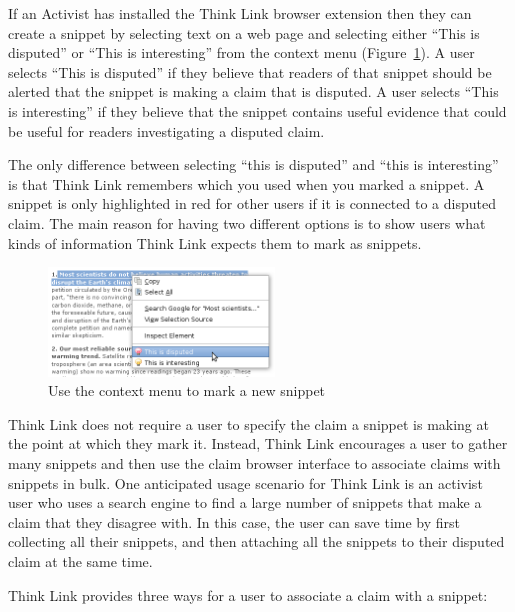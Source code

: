 \documentclass{chi2009}
\newcommand{\todo}[1]{}
\begin{document}
If an Activist has installed the Think Link browser extension then they can create a snippet by selecting text on a web page and selecting either ``This is disputed'' or ``This is interesting'' from the context menu (Figure~\ref{createprocess}). A user selects ``This is disputed'' if they believe that readers of that snippet should be alerted that the snippet is making a claim that is disputed. A user selects ``This is interesting'' if they believe that the snippet contains useful evidence that could be useful for readers investigating a disputed claim. 

The only difference between selecting ``this is disputed'' and ``this is interesting'' is that Think Link remembers which you used when you marked a snippet. A snippet is only highlighted in red for other users if it is connected to a disputed claim. The main reason for having two different options is to show users what kinds of information Think Link expects them to mark as snippets.
\todo{Say something smart about the difference}

\begin{figure}[tb]
	\begin{center}
	\includegraphics[width=6cm]{../screenshots/v2_snipmark.png}
	\caption{Use the context menu to mark a new snippet}
	\label{createprocess}
	\end{center}
\end{figure}

Think Link does not require a user to specify the claim a snippet is making at the point at which they mark it. Instead, Think Link encourages a user to gather many snippets and then use the claim browser interface to associate claims with snippets in bulk.
One anticipated usage scenario for Think Link is an activist user who uses a search engine to find a large number of snippets that make a claim that they disagree with. 
In this case, the user can save time by first collecting all their snippets, and then attaching all the snippets to their disputed claim at the same time.

Think Link provides three ways for a user to associate a claim with a snippet:
\end{document}
